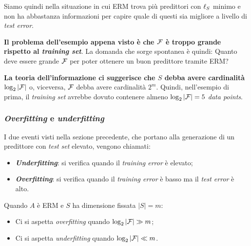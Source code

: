 Siamo quindi nella situazione in cui ERM trova più predittori con $\ell_S$ minimo e non
ha abbastanza informazioni per capire quale di questi sia migliore a livello di
\textit{test error}.

\textbf{Il problema dell'esempio appena visto è che $\mathcal{F}$ è troppo grande rispetto al
\textit{training set}}. La domanda che sorge spontanea è quindi: Quanto deve essere 
grande $\mathcal{F}$ per poter ottenere un buon predittore tramite ERM?

\textbf{La teoria dell'informazione ci suggerisce che $S$ debba avere cardinalità
$\log_2{|\mathcal{F}|}$} o, viceversa, $\mathcal{F}$ debba avere cardinalità $2^m$. Quindi, nell'esempio
di prima, il \textit{training set} avrebbe dovuto contenere almeno $\log_2{|\mathcal{F}|}=5$
\textit{data points}.

\subsubsection{\textit{Overfitting} e \textit{underfitting}}

I due eventi visti nella sezione precedente, che portano alla generazione di un predittore con 
\textit{test set} elevato, vengono chiamati:
\begin{itemize}
    \item \textbf{\textit{Underfitting}}: si verifica quando il \textit{training error} 
        è elevato;
    \item \textbf{\textit{Overfitting}}: si verifica quando il \textit{training error} 
    è basso ma il \textit{test error} è alto.
\end{itemize}

Quando $A$ è ERM e $S$ ha dimensione fissata $|S|=m$:
\begin{itemize}
    \item Ci si aspetta \textit{overfitting} quando $\log_2|\mathcal{F}| \gg m $;
    \item Ci si aspetta \textit{underfitting} quando $\log_2|\mathcal{F}| \ll m $.
\end{itemize}

